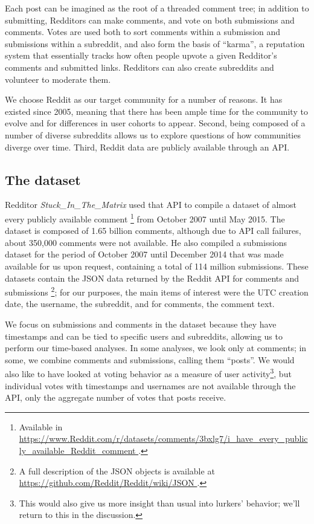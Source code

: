 Each post can be imagined as the root of a threaded comment tree; in addition to submitting, Redditors can make comments, and vote on both submissions and comments.  Votes are used both to sort comments within a submission and submissions within a subreddit, and also form the basis of ``karma'', a reputation system that essentially tracks how often people upvote a given Redditor's comments and submitted links.  Redditors can also create subreddits and volunteer to moderate them.

We choose Reddit as our target community for a number of reasons.  It has existed since 2005, meaning that there has been ample time for the community to evolve and for differences in user cohorts to appear.  Second, being composed of a number of diverse subreddits allows us to explore questions of how communities diverge over time.  Third, Reddit data are publicly available through an API.

\subsection{The dataset}

Redditor \textit{Stuck\_In\_The\_Matrix} used that API to compile a dataset of almost every publicly available comment \footnote{Available in \url{https://www.Reddit.com/r/datasets/comments/3bxlg7/i_have_every_publicly_available_Reddit_comment }.} from October 2007 until May 2015.  The dataset is composed of 1.65 billion comments, although due to API call failures, about 350,000 comments were not available.  He also compiled a submissions dataset for the period of October 2007 until December 2014 that was made available for us upon request, containing a total of 114 million submissions.  These datasets contain the JSON data returned by the Reddit API for comments and submissions \footnote{A full description of the JSON objects is available at \url{https://github.com/Reddit/Reddit/wiki/JSON }.}; for our purposes, the main items of interest were the UTC creation date, the username, the subreddit, and for comments, the comment text.

We focus on submissions and comments in the dataset because they have timestamps and can be tied to specific users and subreddits, allowing us to perform our time-based analyses.   In some analyses, we look only at comments; in some, we combine comments and submissions, calling them ``posts''.  We would also like to have looked at voting behavior as a measure of user activity\footnote{This would also give us more insight than usual into lurkers' behavior; we'll return to this in the discussion.}, but individual votes with timestamps and usernames are not available through the API, only the aggregate number of votes that posts receive.

